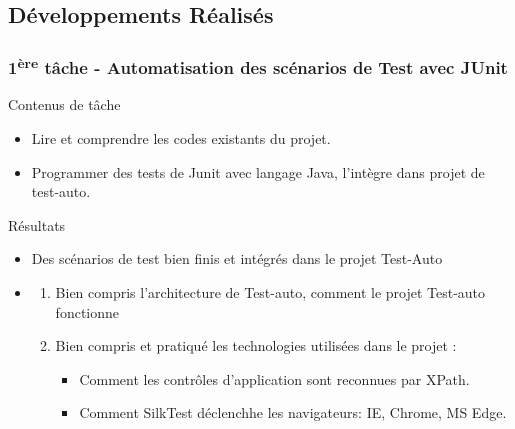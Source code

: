 \documentclass{beamer}
\begin{document}
        \subsection{Développements Réalisés}
        \begin{frame}[t]
            \frametitle{1\textsuperscript{ère} tâche - Automatisation des scénarios de Test avec JUnit}
            \begin{block}{Contenus de tâche}
                \begin{itemize}
                    \item Lire et comprendre les codes existants du projet.
                    \item Programmer des tests de Junit avec langage Java, l'intègre dans projet de test-auto.
                \end{itemize}
            \end{block}
            
            \pause
            \begin{block}{Résultats}
                \begin{itemize}
                    \item Des scénarios de test bien finis et intégrés dans le projet Test-Auto
                    \item \begin{enumerate}
                        \item Bien compris l'architecture de Test-auto, comment le projet Test-auto fonctionne
                        \item Bien compris et pratiqué les technologies utilisées dans le projet : 
                            \begin{itemize}
                                \item Comment les contrôles d'application sont reconnues par XPath.
                                \item Comment SilkTest déclenchhe les navigateurs: IE, Chrome, MS Edge.
                            \end{itemize}
                    \end{enumerate}
                \end{itemize}
            \end{block}
        \end{frame}
        
\end{document}
